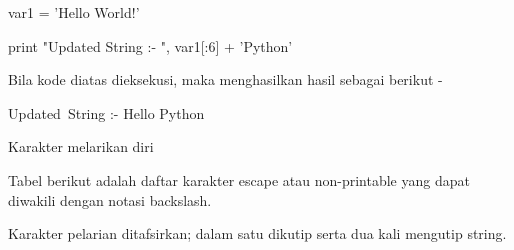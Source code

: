 \documentclass[a4paper,12pt]{report}
\begin{document}
\noindent 
\vspace{12pt}
\noindent 
\vspace{12pt}
\noindent 
var1 = 'Hello World!' \par
\noindent 
\vspace{12pt}
\noindent 
print "Updated String :- ", var1[:6] + 'Python' \par
\vspace{12pt}
\noindent 
Bila kode diatas dieksekusi, maka menghasilkan hasil sebagai berikut - \par
\noindent 
\vspace{12pt}
\noindent 
Updated~String :-  Hello Python \par
\noindent 
\vspace{12pt}
\noindent 
Karakter melarikan diri \par
\vspace{12pt}
\noindent 
Tabel berikut adalah daftar karakter escape atau non-printable yang dapat diwakili dengan notasi backslash. \par
\noindent 
Karakter pelarian ditafsirkan; dalam satu dikutip serta dua kali mengutip string. \par
\vspace{12pt}


\end{document}
